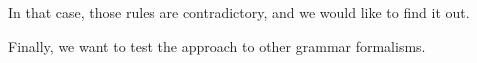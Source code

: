 In that case, those rules are contradictory, and we would like to find it out.

Finally, we want to test the approach to other grammar formalisms.




